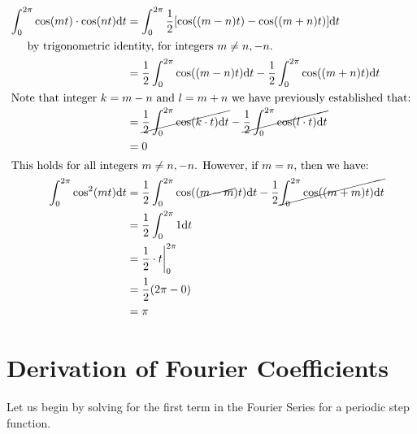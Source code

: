\documentclass[10pt]{article} %
\begin{document}
\begin{align*}
    \int_0^{2\pi} \cos(mt) \cdot \cos(nt) \mathrm{d}t &=\int_0^{2\pi}\frac12[\cos((m-n)t) - \cos((m+n)t)]\mathrm{d}t \\
    \intertext{\hspace{0.5cm}by trigonometric identity, for integers $m \neq n, -n$.}
    & =\frac12\int_0^{2\pi}\cos((m-n)t)\mathrm{d}t - \frac12\int_0^{2\pi}\cos((m+n)t)\mathrm{d}t\\
    \intertext{Note that integer $k=m-n$ and $l=m+n$ we have previously established that:}
    & =\cancel{\frac12\int_0^{2\pi}\cos(k \cdot t)\mathrm{d}t} - \cancel{\frac12\int_0^{2\pi}\cos(l \cdot t)\mathrm{d}t}\\
    & = 0 \\
    \intertext{This holds for all integers $m \neq n, -n$. However, if $m = n$, then we have:}
    \int_0^{2\pi} \cos^2(mt)\mathrm{d}t & = \frac12\int_0^{2\pi}\cos((\cancel{m-m})t)\mathrm{d}t - \frac12\cancel{\int_0^{2\pi}\cos((m+m)t)\mathrm{d}t}\\
    & = \frac12\int_0^{2\pi}1\mathrm{d}t\\
    & = \frac12 \cdot t \bigg\rvert_0^{2\pi} \\
    & = \frac12 (2\pi - 0) \\
    & = \pi
\end{align*}

\section*{Derivation of Fourier Coefficients}

Let us begin by solving for the first term in the Fourier Series for a periodic step function.
\end{document}
